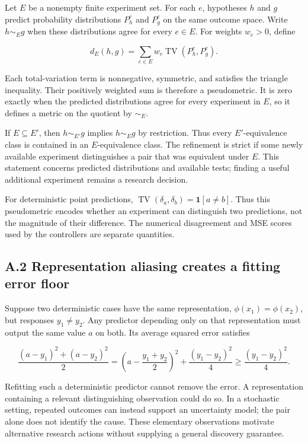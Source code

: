 \documentclass[twoside,11pt]{article}
\begin{document}
Let \(E\) be a nonempty finite experiment set. For each \(e\), hypotheses \(h\) and \(g\) predict probability distributions \(P_h^e\) and \(P_g^e\) on the same outcome space. Write \(h\sim_Eg\) when these distributions agree for every \(e\in E\). For weights \(w_e>0\), define


\[
d_E(h,g)=\sum_{e\in E}w_e\operatorname{TV}(P_h^e,P_g^e).
\]


Each total-variation term is nonnegative, symmetric, and satisfies the triangle inequality. Their positively weighted sum is therefore a pseudometric. It is zero exactly when the predicted distributions agree for every experiment in \(E\), so it defines a metric on the quotient by \(\sim_E\).


If \(E\subseteq E'\), then \(h\sim_{E'}g\) implies \(h\sim_Eg\) by restriction. Thus every \(E'\)-equivalence class is contained in an \(E\)-equivalence class. The refinement is strict if some newly available experiment distinguishes a pair that was equivalent under \(E\). This statement concerns predicted distributions and available tests; finding a useful additional experiment remains a research decision.


For deterministic point predictions, \(\operatorname{TV}(\delta_a,\delta_b)=\mathbf 1[a\ne b]\). Thus this pseudometric encodes whether an experiment can distinguish two predictions, not the magnitude of their difference. The numerical disagreement and MSE scores used by the controllers are separate quantities.


\subsection*{A.2 Representation aliasing creates a fitting error floor}

Suppose two deterministic cases have the same representation, \(\phi(x_1)=\phi(x_2)\), but responses \(y_1\ne y_2\). Any predictor depending only on that representation must output the same value \(a\) on both. Its average squared error satisfies


\[
\frac{(a-y_1)^2+(a-y_2)^2}{2}
=\left(a-\frac{y_1+y_2}{2}\right)^2
+\frac{(y_1-y_2)^2}{4}
\geq\frac{(y_1-y_2)^2}{4}.
\]


Refitting such a deterministic predictor cannot remove the error. A representation containing a relevant distinguishing observation could do so. In a stochastic setting, repeated outcomes can instead support an uncertainty model; the pair alone does not identify the cause. These elementary observations motivate alternative research actions without supplying a general discovery guarantee.
\end{document}

